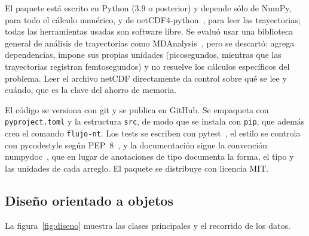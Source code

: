 \documentclass[11pt,a4paper]{article}
\newcommand{\comando}{\texttt{flujo-nt}}
\begin{document}
El paquete está escrito en Python (3.9 o posterior) y depende sólo de NumPy, para
todo el cálculo numérico, y de netCDF4-python~\cite{netcdf4python}, para leer
las trayectorias; todas las herramientas usadas son software libre. Se evaluó
usar una biblioteca general de análisis de trayectorias como
MDAnalysis~\cite{mdanalysis}, pero se descartó: agrega dependencias, impone
sus propias unidades (picosegundos, mientras que las trayectorias registran
femtosegundos) y no resuelve los cálculos específicos del problema. Leer el
archivo netCDF directamente da control sobre qué se lee y cuándo, que es la
clave del ahorro de memoria.

El código se versiona con git y se publica en GitHub. Se empaqueta con
\texttt{pyproject.toml} y la estructura \texttt{src}, de modo que se instala
con \texttt{pip}, que además crea el comando \comando. Los tests se escriben
con pytest~\cite{pytest}, el estilo se controla con pycodestyle según
PEP~8~\cite{pep8}, y la documentación sigue la convención
numpydoc~\cite{numpydoc}, que en lugar de anotaciones de tipo documenta la
forma, el tipo y las unidades de cada arreglo. El paquete se distribuye con
licencia MIT.

\subsection{Diseño orientado a objetos}


La figura~\ref{fig:diseno} muestra las clases principales y el recorrido de
los datos.
\end{document}
